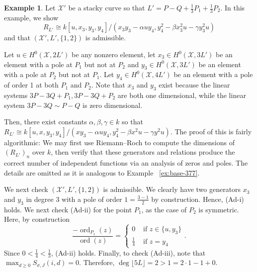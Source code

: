 \documentclass{amsart}
\theoremstyle{plain}
\theoremstyle{definition}
\newtheorem{example}[thm]{Example}
\theoremstyle{remark}
\numberwithin{equation}{section}
\newcommand \sx{\mathscr X}
\DeclareMathOperator{\ord}{ord}
\newcommand \halfcan{L}
\begin{document}
\begin{example}
\label{eg:base-1-33}
Let $\sx'$ be a stacky curve so that $\halfcan' = P - Q + \frac{1}{3}P_1 + \frac{1}{3}P_2$. In this example, we show
$$R_{\halfcan'} \cong k[u, x_3, y_3, y_4]/(x_3 y_3- \alpha uy_4, y_4^2 - \beta x_3^2 u - \gamma y_3^2u)$$
and that $(\sx', \halfcan',\{1,2\})$ is admissible.

Let $u \in H^0(\sx,2\halfcan')$ be any nonzero element, let $x_3 \in H^0(\sx,3\halfcan')$ be an element with a pole at $P_1$ but not at $P_2$ and $y_3 \in H^0(\sx,3\halfcan')$ be an element with a pole at $P_2$ but not at $P_1$. Let $y_4 \in H^0(\sx,4\halfcan')$ be an element with a pole of order 1 at both $P_1$ and $P_2$. Note that $x_3$ and $y_3$ exist because the linear systems $3P - 3Q + P_1, 3P - 3Q + P_2$ are both one dimensional, while the linear system $3P - 3Q \sim P - Q$ is zero dimensional.

Then, there exist constants $\alpha,\beta,\gamma \in k$ so that 
$R_{\halfcan'} \cong k[u, x, y_3, y_4]/(xy_3- \alpha uy_4, y_4^2 - \beta x^2 u - \gamma y^2u).$ The proof of this is fairly algorithmic: We may first use Riemann--Roch to compute the dimensions of $(R_{\halfcan'})_n$ over $k$, then verify that these generators and relations produce the correct number of independent functions via an analysis of zeros and poles. The details are omitted as it is analogous to Example ~\ref{ex:base-377}.

We next check $(\sx', \halfcan',\{1,2\})$ is admissible. We clearly have two generators $x_3$ and $y_3$ in degree 3 with a pole of order $1=\frac{3- 1}{2}$ by construction. Hence, (Ad-i) holds. We next check (Ad-ii) for the point $P_1$, as the case of $P_2$ is symmetric. Here, by construction
$$
\frac{-\ord_{P_1}(z)}{\ord(z)} = \begin{cases}
	0 &\text{ if }z \in \{u, y_3\}\\
	\frac{1}{4} &\text{ if }z = y_4
\end{cases}.$$
Since $0 < \frac{1}{4} < \frac{1}{3}$, (Ad-ii) holds.
Finally, to check (Ad-iii), note that $\max_{d \geq 0}S_{\sigma,J}(i,d) = 0.$ Therefore, $\deg \lfloor 5L \rfloor  = 2 > 1 = 2 \cdot 1 - 1 + 0$.
\end{example}
\end{document}
